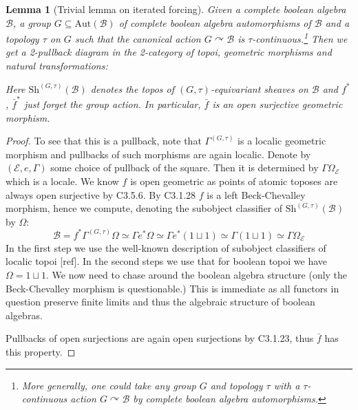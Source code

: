 \documentclass[a4paper]{amsproc}
\theoremstyle{plain}
\newtheorem{lemma}{Lemma}[section]
\theoremstyle{definition}
\theoremstyle{remark}
\numberwithin{equation}{section}
\begin{document}
\begin{lemma}[Trivial lemma on iterated forcing] Given a complete boolean algebra $\mathcal{B}$, a group $G\subseteq \text{Aut}(\mathcal{B})$ of complete boolean algebra automorphisms of $\mathcal{B}$ and a topology $\tau$ on $G$ such that the canonical action $G\curvearrowright \mathcal{B}$ is $\tau$-continuous.\footnote{More generally, one could take any group $G$ and topology $\tau$ with a $\tau$-continuous action $G\curvearrowright \mathcal{B}$ by complete boolean algebra automorphisms.} Then we get a 2-pullback diagram in the 2-category of topoi, geometric morphisms and natural transformations:
\begin{center}
\end{center}
Here $\text{Sh}^{(G,\tau)}(\mathcal{B})$ denotes the topos of $(G,\tau)$-equivariant sheaves on $\mathcal{B}$ and $f^*$, $\bar{f}^*$ just forget the group action.\newline
\indent In particular, $\bar{f}$ is an open surjective geometric morphism.
\end{lemma}
\begin{proof} To see that this is a pullback, note that $\Gamma^{(G,\tau)}$ is a localic geometric morphism and pullbacks of such morphisms are again localic. Denote by $(\mathcal{E},e,\Gamma)$ some choice of pullback of the square. Then it is determined by $\Gamma \Omega_\mathcal{E}$ which is a locale. We know $f$ is open geometric as points of atomic toposes are always open surjective by C3.5.6. By C3.1.28 $f$ is a left Beck-Chevalley morphism, hence we compute, denoting the subobject classifier of $\text{Sh}^{(G,\tau)}(\mathcal{B})$ by $\Omega$:
\[ \mathcal{B}=f^*\Gamma^{(G,\tau)}\Omega\simeq \Gamma e^*\Omega\simeq \Gamma e^*(1\sqcup 1)\simeq \Gamma (1\sqcup 1)\simeq\Gamma \Omega_\mathcal{E}  \]
\newline
In the first step we use the well-known description of subobject classifiers of localic topoi [ref]. In the second steps we use that for boolean topoi we have $\Omega=1\sqcup 1$. We now need to chase around the boolean algebra structure (only the Beck-Chevalley morphism is questionable.) This is immediate as all functors in question preserve finite limits and thus the algebraic structure of boolean algebras.

\indent Pullbacks of open surjections are again open surjections by C3.1.23, thus $\bar{f}$ has this property. 
\end{proof}
\end{document}
